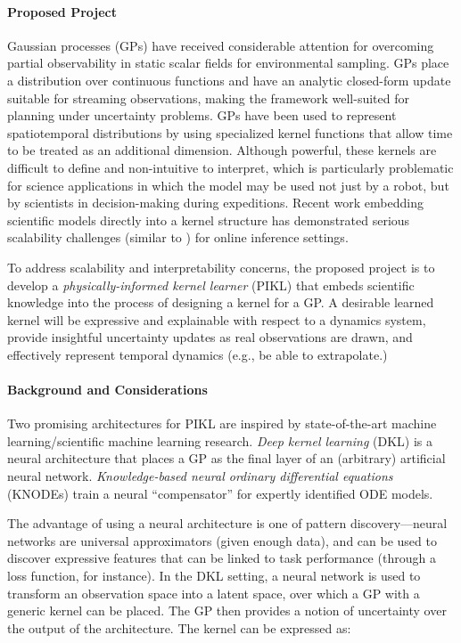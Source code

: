 \paragraph{Proposed Project}
Gaussian processes\autocite{Rasmussen2004} (GPs) have received considerable attention for overcoming partial observability in static scalar fields for environmental sampling\autocite{zhang2007adaptive,Hitz2017,Marchant2014a}.
GPs place a distribution over continuous functions and have an analytic closed-form update suitable for streaming observations, making the framework well-suited for planning under uncertainty problems.
GPs have been used to represent spatiotemporal distributions by using specialized kernel functions that allow time to be treated as an additional dimension\autocite{Marchant2014a,garg2012learning,singh2010modeling}.
Although powerful, these kernels are difficult to define and non-intuitive to interpret, which is particularly problematic for science applications in which the model may be used not just by a robot, but by scientists in decision-making during expeditions.
Recent work embedding scientific models directly into a kernel structure\autocite{raissi2018numerical} has demonstrated serious scalability challenges (similar to \PHUMES) for online inference settings.

To address scalability and interpretability concerns, the proposed project is to develop a \emph{physically-informed kernel learner} (PIKL) that embeds scientific knowledge into the process of designing a kernel for a GP. A desirable learned kernel will be expressive and explainable with respect to a dynamics system, provide insightful uncertainty updates as real observations are drawn, and effectively represent temporal dynamics (e.g., be able to extrapolate.)

\paragraph{Background and Considerations}
Two promising architectures for PIKL are inspired by state-of-the-art machine learning/scientific machine learning research. \emph{Deep kernel learning}\autocite{wilson2015kernel} (DKL) is a neural architecture that places a GP as the final layer of an (arbitrary) artificial neural network. \emph{Knowledge-based neural ordinary differential equations}\autocite{jiahao2021knowledge} (KNODEs) train a neural ``compensator'' for expertly identified ODE models.

The advantage of using a neural architecture is one of pattern discovery---neural networks are universal approximators (given enough data), and can be used to discover expressive features that can be linked to task performance (through a loss function, for instance). In the DKL setting, a neural network is used to transform an observation space into a latent space, over which a GP with a generic kernel can be placed. The GP then provides a notion of uncertainty over the output of the architecture. The kernel can be expressed as:

